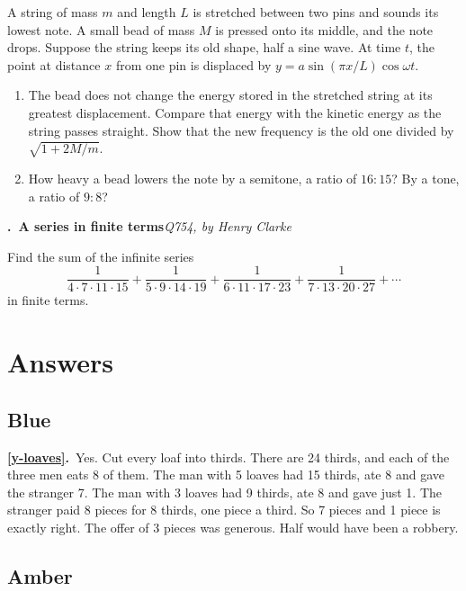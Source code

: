 \documentclass[11pt,a4paper]{article}
\newcounter{prob}
\newcommand{\prob}[3]{\par\bigskip\refstepcounter{prob}\label{#1}%
  \noindent\textbf{\theprob.\ #2}\hfill{\small\textit{#3}}\par\nopagebreak\smallskip}
\newcommand{\ans}[2]{\par\smallskip\noindent\textbf{\ref{#1}.}\ #2}
\begin{document}
A string of mass $m$ and length $L$ is stretched between two pins and sounds its lowest
note. A small bead of mass $M$ is pressed onto its middle, and the note drops. Suppose
the string keeps its old shape, half a sine wave. At time $t$, the point at distance $x$
from one pin is displaced by $y = a\sin(\pi x/L)\cos\omega t$.
\begin{enumerate}[label=(\alph*),nosep]
\item The bead does not change the energy stored in the stretched string at its greatest
displacement. Compare that energy with the kinetic energy as the string passes straight.
Show that the new frequency is the old one divided by $\sqrt{1+2M/m}$.
\item How heavy a bead lowers the note by a semitone, a ratio of $16:15$? By a tone, a
ratio of $9:8$?
\end{enumerate}

\prob{y-series}{A series in finite terms}{Q754, by Henry Clarke}
Find the sum of the infinite series
\[
\frac{1}{4\cdot7\cdot11\cdot15} + \frac{1}{5\cdot9\cdot14\cdot19}
+ \frac{1}{6\cdot11\cdot17\cdot23} + \frac{1}{7\cdot13\cdot20\cdot27} + \cdots
\]
in finite terms.

\clearpage
\section*{Answers}

\subsection*{\color{bandblue}Blue}

\ans{y-loaves}{Yes. Cut every loaf into thirds. There are 24 thirds, and each of the
three men eats 8 of them. The man with 5 loaves had 15 thirds, ate 8 and gave the
stranger 7. The man with 3 loaves had 9 thirds, ate 8 and gave just 1. The stranger paid
8 pieces for 8 thirds, one piece a third. So 7 pieces and 1 piece is exactly right. The
offer of 3 pieces was generous. Half would have been a robbery.}

\subsection*{\color{bandamber}Amber}
\end{document}

